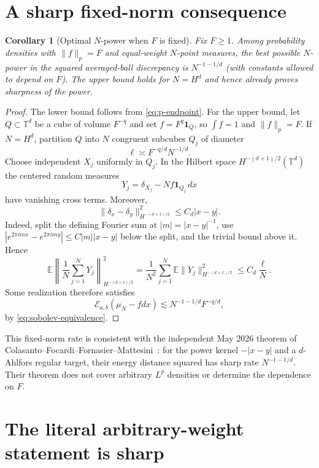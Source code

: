 \documentclass[11pt]{article}
\newtheorem{corollary}{Corollary}
\newcommand{\T}{\mathbb T}
\newcommand{\Ecal}{\mathcal E}
\begin{document}
\section{A sharp fixed-norm consequence}

\begin{corollary}[Optimal $N$-power when $F$ is fixed]\label{cor:fixed}
Fix $F\ge1$.  Among probability densities with $\|f\|_p=F$ and equal-weight
$N$-point measures, the best possible $N$-power in the squared averaged-ball
discrepancy is $N^{-1-1/d}$ (with constants allowed to depend on $F$).  The
upper bound holds for $N=H^d$ and hence already proves sharpness of the power.
\end{corollary}

\begin{proof}
The lower bound follows from \eqref{eq:p-endpoint}.  For the upper bound,
let $Q\subset\T^d$ be a cube of volume $F^{-q}$ and set
$f=F^q\mathbf1_Q$, so $\int f=1$ and $\|f\|_p=F$.  If $N=H^d$, partition
$Q$ into $N$ congruent subcubes $Q_j$ of diameter
\[
 \ell\asymp F^{-q/d}N^{-1/d}.
\]
Choose independent $X_j$ uniformly in $Q_j$.  In the Hilbert space
$H^{-(d+1)/2}(\T^d)$ the centered random measures
\[
 Y_j=\delta_{X_j}-Nf\mathbf1_{Q_j}\,dx
\]
have vanishing cross terms.  Moreover,
\begin{equation}\label{eq:dirac-distance}
 \|\delta_x-\delta_y\|_{H^{-(d+1)/2}}^2\le C_d|x-y|.
\end{equation}
Indeed, split the defining Fourier sum at $|m|=|x-y|^{-1}$, use
$|e^{2\pi imx}-e^{2\pi imy}|\le C|m||x-y|$ below the split, and the trivial
bound above it.  Hence
\[
 \mathbb E\left\|\frac1N\sum_{j=1}^NY_j\right\|_{H^{-(d+1)/2}}^2
 =\frac1{N^2}\sum_{j=1}^N\mathbb E\|Y_j\|_{H^{-(d+1)/2}}^2
 \le C_d\frac{\ell}{N}.
\]
Some realization therefore satisfies
\[
 \Ecal_{a,b}(\mu_N-fdx)
 \lesssim N^{-1-1/d}F^{-q/d},
\]
by \eqref{eq:sobolev-equivalence}.
\end{proof}

This fixed-norm rate is consistent with the independent May 2026 theorem of
Colasanto--Focardi--Fornasier--Mattesini~\cite{mmd}: for the power kernel
$-|x-y|$ and a $d$-Ahlfors regular target, their energy distance squared has
sharp rate $N^{-1-1/d}$.  Their theorem does not cover arbitrary $L^p$
densities or determine the dependence on $F$.

\section{The literal arbitrary-weight statement is sharp}
\end{document}
